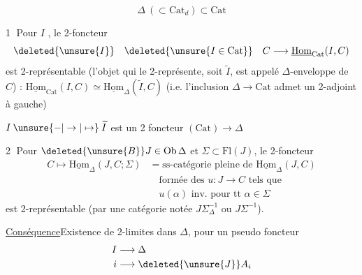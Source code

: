 \[
\Delta\ (\subset\mathrm{Cat}_{d})\subset\mathrm{Cat}
\]

\textcircled{1} Pour $I$ , le 2-foncteur
\[
\deleted{\unsure{I}}\quad\deleted{\unsure{I\in\mathrm{Cat}}}\quad C\longrightarrow\underline{\mathrm{Hom}}_{\mathrm{Cat}}(I,C)
\]
est 2-représentable (l'objet qui le 2-représente, soit $\widetilde I$, est appelé $\Delta$-enveloppe de $C$) : $\underline{\mathrm{Hom}}_{\mathrm{Cat}}(I,C)\simeq\underline{\mathrm{Hom}}_{\Delta}(\widetilde I,C)$
(i.e. l'inclusion $\Delta\longrightarrow\mathrm{Cat}$
admet un 2-adjoint à gauche)

$I\mathbin{\unsure{-|\to|\mapsto}}\widetilde I$ est un 2 foncteur $(\mathrm{Cat})\longrightarrow\Delta$

\textcircled{2} Pour $\deleted{\unsure{B}}J\in\mathrm{Ob}\,\Delta$ et $\Sigma\subset\mathrm{Fl}(J)$, le 2-foncteur
\[
\begin{aligned}
 C\longmapsto\underline{\mathrm{Hom}}_{\Delta}(J,C;\Sigma)
 &=\text{ss-catégorie pleine de }\underline{\mathrm{Hom}}_{\Delta}(J,C)\\
 &\quad\text{formée des }u:J\to C\text{ tels que}\\
 &\quad u(\alpha)\text{ inv. pour tt }\alpha\in\Sigma
\end{aligned}
\]
est 2-représentable (par une catégorie notée $J\Sigma_{\Delta}^{-1}$ ou $J\Sigma^{-1}$).

\uline{Conséquence}\quad Existence de 2-limites  dans $\Delta$, pour un pseudo foncteur
\[
\begin{aligned}
 I&\longrightarrow\Delta\\
 i&\longrightarrow\deleted{\unsure{J}}A_i
\end{aligned}
\]

